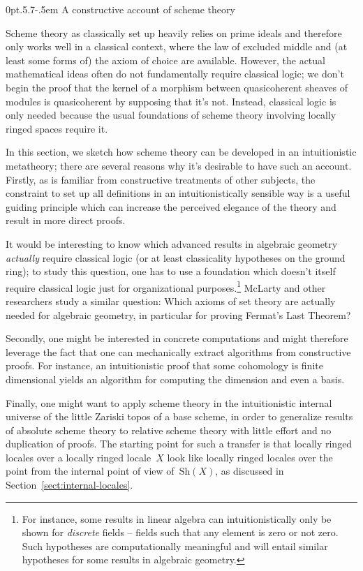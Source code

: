 \documentclass[10pt,reqno,a4paper]{amsbook}
\makeatletter
\theoremstyle{definition}
\theoremstyle{plain}
\theoremstyle{remark}
\newcommand{\Sh}{\mathrm{Sh}}
\newcommand{\?}{\,{:}\,}
\renewcommand{\_}{\mathpunct{.}\,}
\def\subsection{\@startsection{subsection}{2}%
  {0pt}{.5\linespacing\@plus.7\linespacing}{-.5em}%
  {\normalfont\bfseries}}
\makeatother
\begin{document}
\subsection{A constructive account of scheme theory}
\label{sect:constructive-scheme-theory}

Scheme theory as classically set up heavily relies on prime ideals and
therefore only works well in a classical context, where the law of excluded
middle and (at least some forms of) the axiom of choice are available. However,
the actual mathematical ideas often do not fundamentally require classical logic; we
don't begin the proof that the kernel of a morphism between quasicoherent
sheaves of modules is quasicoherent by supposing that it's not. Instead,
classical logic is only needed because the usual foundations of scheme theory
involving locally ringed spaces require it.

In this section, we sketch how scheme theory can be developed in an
intuitionistic metatheory; there are several reasons why it's desirable to have
such an account. Firstly, as is familiar from constructive treatments of other
subjects, the constraint to set up all definitions in an intuitionistically
sensible way is a useful guiding principle which can increase the perceived
elegance of the theory and result in more direct proofs.

It would be interesting to know which advanced results in algebraic geometry
\emph{actually} require classical logic (or at least classicality hypotheses on
the ground ring); to study this question, one has to use a foundation
which doesn't itself require classical logic just for organizational
purposes.\footnote{For instance, some results in linear algebra can
intuitionistically only be shown for \emph{discrete} fields -- fields such that
any element is zero or not zero. Such hypotheses are computationally meaningful
and will entail similar hypotheses for some results in algebraic geometry.}
McLarty and other researchers study a similar question: Which axioms of set
theory are actually needed for algebraic geometry, in particular for proving
Fermat's Last Theorem?~\cite{mclarty:what-does-it-take}

Secondly, one might be interested in concrete computations and might therefore
leverage the fact that one can mechanically extract algorithms from
constructive proofs. For instance, an intuitionistic proof that some cohomology
is finite dimensional yields an algorithm for computing the dimension and even
a basis.

Finally, one might want to apply scheme theory in the intuitionistic internal
universe of the little Zariski topos of a base scheme, in order to generalize
results of absolute scheme theory to relative scheme theory with little effort
and no duplication of proofs. The starting point for such a transfer is that
locally ringed locales over a locally ringed locale~$X$ look like locally
ringed locales over the point from the internal point of view of~$\Sh(X)$, as
discussed in Section~\ref{sect:internal-locales}.
\end{document}
